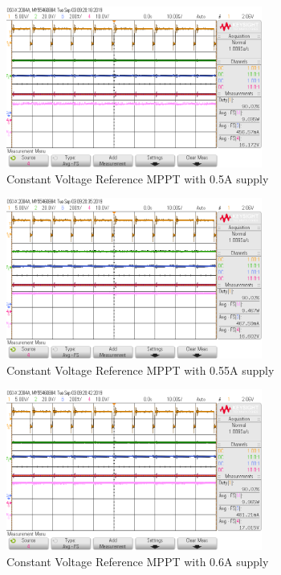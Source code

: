 \documentclass[]{article}
\begin{document}
                \begin{figure}[H]
                    \centering
                    \includegraphics[width=0.75\textwidth]{Lab3Results/0_50A_Supply}
                    \caption{Constant Voltage Reference MPPT with 0.5A supply}
                    \label{fig:Lab3_0.5A}
                \end{figure}
                \begin{figure}[H]
                    \centering
                    \includegraphics[width=0.75\textwidth]{Lab3Results/0_55A_Supply}
                    \caption{Constant Voltage Reference MPPT with 0.55A supply}
                    \label{fig:Lab3_0.55A}
                \end{figure}
                \begin{figure}[H]
                    \centering
                    \includegraphics[width=0.75\textwidth]{Lab3Results/0_60A_Supply}
                    \caption{Constant Voltage Reference MPPT with 0.6A supply}
                    \label{fig:Lab3_0.6A}
                \end{figure}
\end{document}
